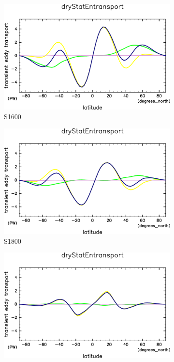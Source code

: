 \documentclass[body]{subfiles}
\begin{document}
\begin{figure}[t]
\begin{subfigure}{.4\textwidth}
	\end{subfigure}
	\begin{subfigure}{.4\textwidth}
		\centering
		\includegraphics[width=\textwidth]{S1600/MeriHeatTrans@dryStatEn,time=3650:4015-crop-rotate.pdf}
		\caption{S1600}\label{乾燥静的エネルギーS1600}
	\end{subfigure}
	\begin{subfigure}{.4\textwidth}
		\centering
		\includegraphics[width=\textwidth]{S1800/MeriHeatTrans@dryStatEn,time=3650:4015-crop-rotate.pdf}
		\caption{S1800}\label{乾燥静的エネルギーS1800}
	\end{subfigure}
	\begin{subfigure}{.4\textwidth}
		\centering
		\includegraphics[width=\textwidth]{S2000/MeriHeatTrans@dryStatEn,time=7300:7665-crop-rotate.pdf}

\end{subfigure}
\end{figure}
\end{document}
